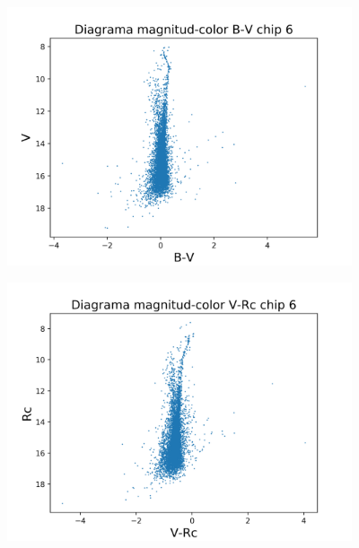 \documentclass[12pt]{article}
\begin{document}
\begin{figure}[H]
  \centering
   \includegraphics[width = 4in]{B-V6.png}
\end{figure}
\begin{figure}[H]
  \centering
   \includegraphics[width = 4in]{V-Rc6.png}
\end{figure}
\end{document}
